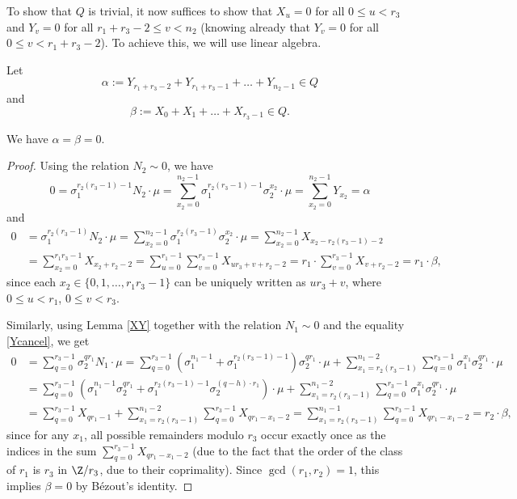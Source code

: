 To show that $Q$ is trivial, it now suffices to show that $X_u=0$ for all $0\leq u< r_3$ and $Y_v=0$ for all $r_1+r_3-2\leq v< n_2$ (knowing already that  $Y_v = 0$ 
for all $0 \le v < r_1 +r_3 - 2$). To achieve this, we will use linear algebra.

%

Let 
\begin{equation*}
\alpha:= Y_{r_1+r_3-2}+Y_{r_1+r_3-1}+\dots+Y_{n_2-1}\in Q
\end{equation*}
and
\begin{equation}\label{beta}
\beta:=X_0+X_1+\dots+X_{r_3-1}\in Q.
\end{equation}

\begin{lemma}\label{AB}
We have $\alpha=\beta=0$.
\end{lemma}
\begin{proof}
Using the relation $N_2\sim 0$, we have $$0=\sigma_1^{r_2(r_3-1)-1}N_2\cdot \mu =\sum_{x_2=0}^{n_2-1}  \sigma_1^{r_2(r_3-1)-1}\sigma_2^{x_2}\cdot \mu= \sum_{x_2=0}^{n_2-1}Y_{x_2}=\alpha$$ and
\begin{align*}
0&= \sigma_1^{r_2(r_3-1)}N_2\cdot \mu=\sum_{x_2=0}^{n_2-1}  \sigma_1^{r_2(r_3-1)}\sigma_2^{x_2}\cdot \mu=\sum_{x_2=0}^{n_2-1}  X_{x_2-r_2(r_3-1)-2}\\
&=\sum_{x_2=0}^{r_1r_3-1}  X_{x_2+r_2-2}=
\sum_{u=0}^{r_1-1}\sum_{v=0}^{r_3-1} X_{ur_3+v+r_2-2}=r_1\cdot \sum_{v=0}^{r_3-1} X_{v+r_2-2}=r_1\cdot \beta,
\end{align*}
since each $x_2\in\{0,1,\dots,r_1r_3-1\}$ can be uniquely written as $ur_3+v$, where $0\leq u<r_1$, $0\leq v<r_3$.%

Similarly, using Lemma \ref{XY} together with the relation $N_1\sim 0$ and the equality \eqref{Ycancel}, %
we get
\begin{align*}
0&= \sum_{q=0}^{r_3-1} \sigma_2^{qr_1}N_1\cdot \mu =\sum_{q=0}^{r_3-1}\left(\sigma_1^{n_1-1}+\sigma_1^{r_2(r_3-1)-1}\right) \sigma_2^{qr_1}\cdot \mu   
+\sum_{x_1=r_2(r_3-1)}^{n_1-2}\sum_{q=0}^{r_3-1} \sigma_1^{x_1}\sigma_2^{qr_1}\cdot \mu\\
&=\sum_{q=0}^{r_3-1}(\sigma_1^{n_1-1}\sigma_2^{qr_1}+\sigma_1^{r_2(r_3-1)-1}\sigma_2^{(q-h)\cdot r_1})\cdot \mu
+\sum_{x_1=r_2(r_3-1)}^{n_1-2}\sum_{q=0}^{r_3-1} \sigma_1^{x_1}\sigma_2^{qr_1}\cdot \mu\\
&=\sum_{q=0}^{r_3-1}X_{qr_1-1}+\sum_{x_1=r_2(r_3-1)}^{n_1-2}\sum_{q=0}^{r_3-1}X_{qr_1-x_1-2}
= \sum_{x_1=r_2(r_3-1)}^{n_1-1}\sum_{q=0}^{r_3-1}X_{qr_1-x_1-2}
=r_2\cdot \beta,
\end{align*}
since for any $x_1$, all possible remainders modulo $r_3$ occur exactly once as the indices in the sum $\sum_{q=0}^{r_3-1}X_{qr_1-x_1-2}$ (due to the fact that the order of the class of $r_1$ is $r_3$ in $\Z/r_3$, due to their coprimality).
Since $\gcd(r_1,r_2)=1$, this implies $\beta=0$ by Bézout's identity.
\end{proof}

